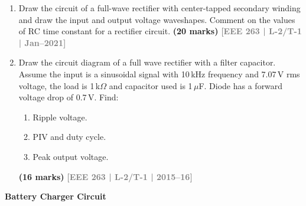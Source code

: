 \documentclass[12pt,a4paper]{article}
\newcommand{\yr}[1]{\hfill\textcolor{gray}{\small\textbf{[#1]}}}
\newcommand{\mk}[1]{\textcolor{orange!70!black}{\small\textbf{(#1 marks)}}}
\newcommand{\subtopic}[2]{%
  \vspace{10pt}
  \noindent\begin{tcolorbox}[colback=#1!8,colframe=#1,boxrule=0.6pt,arc=4pt,
    left=6pt,right=6pt,top=4pt,bottom=4pt]
    \small\bfseries\textcolor{#1}{#2}
  \end{tcolorbox}
  \vspace{2pt}
}
\begin{document}
\begin{enumerate}

\item Draw the circuit of a full-wave rectifier with center-tapped secondary winding and draw the input and output voltage waveshapes. Comment on the values of RC time constant for a rectifier circuit.
\mk{20} \yr{EEE 263 | L-2/T-1 | Jan--2021}    



\item Draw the circuit diagram of a full wave rectifier with a filter capacitor. Assume the input is a sinusoidal signal with 10\,kHz frequency and 7.07\,V rms voltage, the load is 1\,k$\Omega$ and capacitor used is 1\,$\mu$F. Diode has a forward voltage drop of 0.7\,V. Find:
\begin{enumerate}
  \item Ripple voltage.
  \item PIV and duty cycle.
  \item Peak output voltage.
\end{enumerate}
\mk{16} \yr{EEE 263 | L-2/T-1 | 2015--16}

\end{enumerate}

\subtopic{cA}{Battery Charger Circuit}
\label{sub:s1-battery}
\end{document}
